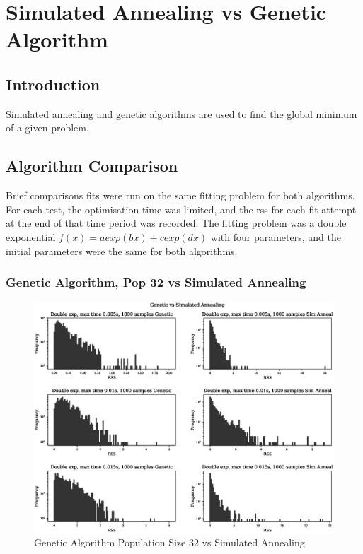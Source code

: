 \chapter{Simulated Annealing vs Genetic Algorithm}

\section{Introduction}

Simulated annealing and genetic algorithms are used to find the global minimum of a given problem.  


\section{Algorithm Comparison}

Brief comparisons fits were run on the same fitting problem for both algorithms.  For each test, the optimisation time was limited, and the rss for each fit attempt at the end of that time period was recorded.  The fitting problem was a double exponential $f(x) = a exp(b x) + c exp( d x)$ with four parameters, and the initial parameters were the same for both algorithms. 



\FloatBarrier
\subsection{Genetic Algorithm, Pop 32 vs Simulated Annealing}

\begin{figure}[h]
  \begin{center}
    \includegraphics[width=15.0cm]{appendix/sim_anneal_genetic/pop_32/plot_name_9.eps}
    \caption{Genetic Algorithm Population Size 32 vs Simulated Annealing}
    \label{fig:ga_vs_sim_32_1}
  \end{center}
\end{figure}


